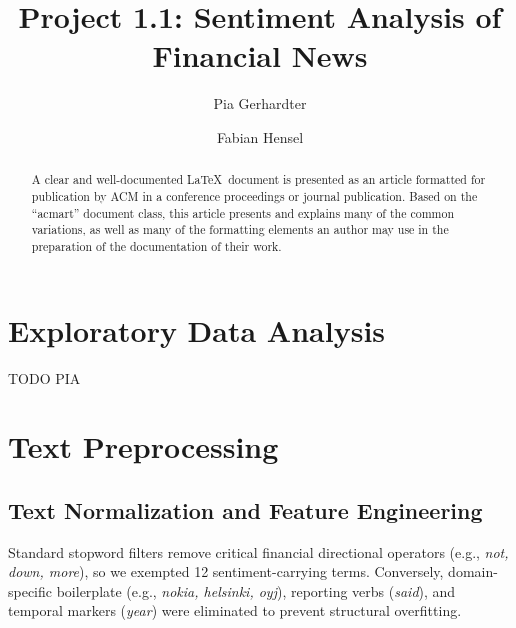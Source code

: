 \documentclass[manuscript,screen,review, nonacm]{acmart}
\begin{document}
\title{Project 1.1: Sentiment Analysis of Financial News}

\author{Pia Gerhardter}

\author{Fabian Hensel}



\begin{abstract}
  A clear and well-documented \LaTeX\ document is presented as an
  article formatted for publication by ACM in a conference proceedings
  or journal publication. Based on the ``acmart'' document class, this
  article presents and explains many of the common variations, as well
  as many of the formatting elements an author may use in the
  preparation of the documentation of their work.
\end{abstract}

\maketitle

\section{Exploratory Data Analysis}
TODO PIA

\section{Text Preprocessing}

\subsection{Text Normalization and Feature Engineering}
Standard stopword filters remove critical financial directional operators (e.g., \textit{not, down, more}), so we exempted 12 sentiment-carrying terms. Conversely, domain-specific boilerplate (e.g., \textit{nokia, helsinki, oyj}), reporting verbs (\textit{said}), and temporal markers (\textit{year}) were eliminated to prevent structural overfitting.
\end{document}
